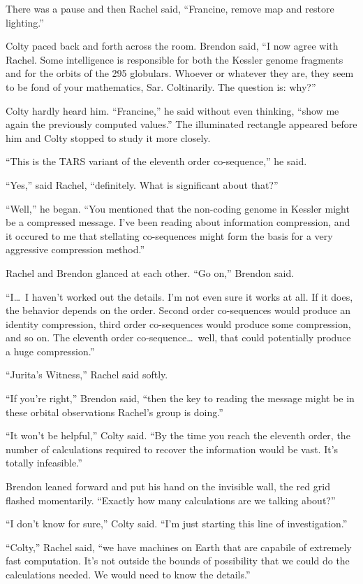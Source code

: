 There was a pause and then Rachel said, ``Francine, remove map and restore lighting.''

Colty paced back and forth across the room. Brendon said, ``I now agree with Rachel. Some
intelligence is responsible for both the Kessler genome fragments and for the orbits of the 295
globulars. Whoever or whatever they are, they seem to be fond of your mathematics, Sar.
Coltinarily. The question is: why?''

Colty hardly heard him. ``Francine,'' he said without even thinking, ``show me again the
previously computed values.'' The illuminated rectangle appeared before him and Colty stopped to
study it more closely.

``This is the TARS variant of the eleventh order co-sequence,'' he said.

``Yes,'' said Rachel, ``definitely. What is significant about that?''

``Well,'' he began. ``You mentioned that the non-coding genome in Kessler might be a compressed
message. I've been reading about information compression, and it occured to me that stellating
co-sequences might form the basis for a very aggressive compression method.''

Rachel and Brendon glanced at each other. ``Go on,'' Brendon said.

``I\ldots\ I haven't worked out the details. I'm not even sure it works at all. If it does, the
behavior depends on the order. Second order co-sequences would produce an identity compression,
third order co-sequences would produce some compression, and so on. The eleventh order
co-sequence\ldots\ well, that could potentially produce a huge compression.''

``Jurita's Witness,'' Rachel said softly.

``If you're right,'' Brendon said, ``then the key to reading the message might be in these
orbital observations Rachel's group is doing.''

``It won't be helpful,'' Colty said. ``By the time you reach the eleventh order, the number of
calculations required to recover the information would be vast. It's totally infeasible.''

Brendon leaned forward and put his hand on the invisible wall, the red grid flashed momentarily.
``Exactly how many calculations are we talking about?''

``I don't know for sure,'' Colty said. ``I'm just starting this line of investigation.''

``Colty,'' Rachel said, ``we have machines on Earth that are capabile of extremely fast
computation. It's not outside the bounds of possibility that we could do the calculations
needed. We would need to know the details.''


